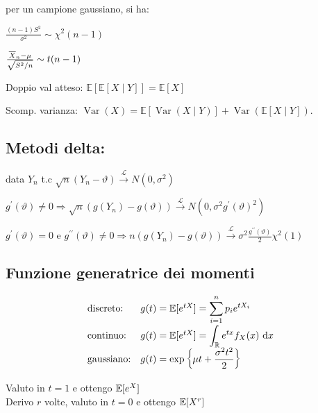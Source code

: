 per un campione gaussiano, si ha:

$\frac{(n-1) S^{2}}{\sigma^{2}} \sim \chi^{2}(n-1)$

$\frac{\overline{X}_n-\mu}{\sqrt{S^{2} / n}} \sim t(n-1)$

Doppio val atteso: $\mathbb{E}[\mathbb{E}[X \mid Y]]=\mathbb{E}[X]$

Scomp. varianza: $\operatorname{Var}(X)=\mathbb{E}[\operatorname{Var}(X \mid Y)]+\operatorname{Var}(\mathbb{E}[X \mid Y])$.

\subsection{Metodi delta:}

$\text{}$\\

data $Y_{n}$ t.c $\sqrt{n}\left(Y_{n}-\vartheta\right) \stackrel{\mathcal{L}}{\rightarrow} N\left(0, \sigma^{2}\right)$

$g^{\prime}(\vartheta) \neq 0 \Longrightarrow \sqrt{n}\left(g\left(Y_{n}\right)-g(\vartheta)\right) \stackrel{\mathcal{L}}{\longrightarrow} N\left(0, \sigma^{2} g^{\prime}(\vartheta)^{2}\right)$

$g^{\prime}(\vartheta)=0$ e $g^{\prime \prime}(\vartheta) \neq 0 \Longrightarrow n\left(g\left(Y_{n}\right)-g(\vartheta)\right) \stackrel{\mathcal{L}}{\longrightarrow} \sigma^{2} \frac{g^{\prime \prime}(\vartheta)}{2} \chi^{2}(1)$

\subsection{Funzione generatrice dei momenti}

$$
{\renewcommand*{\arraystretch}{1.8}
\begin{array}{ll}
\text{discreto:} &g(t)=\EE[e^{tX}]=\displaystyle\sum_{i=1}^n p_i e^{tX_i} \\
\text{continuo:} &g(t)=\EE[e^{tX}]=\displaystyle\int_{\RR} e^{tx}f_X(x)\dx \\
\text{gaussiano:} &g(t)=\displaystyle\exp\left\{\mu t+\frac{\sigma^2t^2}{2}\right\}
\end{array}}
$$

Valuto in $t=1$ e ottengo $\mathbb{E}[e^X]$ \\
Derivo $r$ volte, valuto in $t=0$ e ottengo $\mathbb{E}[X^r]$
